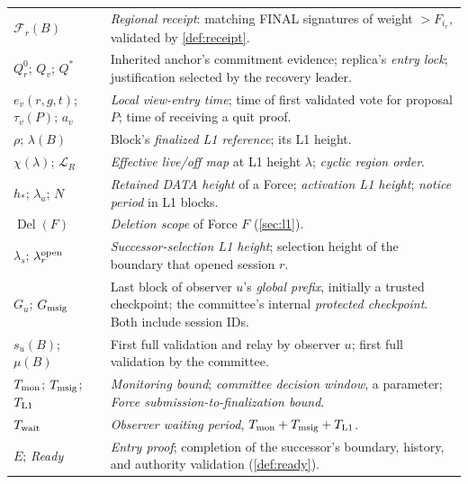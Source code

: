\documentclass[11pt,a4paper]{article}
\newcommand{\FC}{\mathcal F}
\newcommand{\Del}{\operatorname{Del}}
\newcommand{\Twait}{T_{\rm wait}}
\newcommand{\defterm}[1]{\textcolor{rrBlue}{\textit{#1}}}
\begin{document}
\begin{table}[htbp]
\begin{tabularx}{\linewidth}{@{}p{.29\linewidth}Y@{}}
$\FC_r(B)$ & \defterm{Regional receipt}: matching FINAL signatures of weight
$>F_{i_r}$, validated by \cref{def:receipt}.\\
$Q_r^0$; $Q_v$; $Q^*$ & Inherited anchor's commitment evidence; replica's \defterm{entry
lock}; justification selected by the recovery leader.\\
$e_v(r,g,t)$; $\tau_v(P)$; $a_v$ & \defterm{Local view-entry time}; time of first
validated vote for proposal $P$; time of receiving a quit proof.\\
$\rho$; $\lambda(B)$ & Block's \defterm{finalized L1 reference}; its L1 height.\\
$\chi(\lambda)$; $\mathcal L_R$ & \defterm{Effective live/off map} at L1 height
$\lambda$; \defterm{cyclic region order}.\\
$h_*$; $\lambda_a$; $N$ & \defterm{Retained DATA height} of a
Force; \defterm{activation L1 height}; \defterm{notice period} in L1 blocks.\\
$\Del(F)$ & \defterm{Deletion scope} of Force $F$ (\cref{sec:l1}).\\
$\lambda_s$; $\lambda_r^{\rm open}$ & \defterm{Successor-selection L1 height};
selection height of the boundary that opened session $r$.\\
$G_u$; $G_{\rm msig}$ & Last block of observer $u$'s
\defterm{global prefix}, initially a trusted checkpoint; the committee's internal
\defterm{protected checkpoint}. Both include session IDs.\\
$s_u(B)$; $\mu(B)$ & First full validation and relay by observer $u$;
first full validation by the committee.\\
$T_{\rm mon}$; $T_{\rm msig}$; $T_{\rm L1}$ & \defterm{Monitoring bound};
\defterm{committee decision window}, a parameter; \defterm{Force submission-to-finalization bound}.\\
$\Twait$ & \defterm{Observer waiting period},
$T_{\rm mon}+T_{\rm msig}+T_{\rm L1}$.\\
$E$; \defterm{Ready} & \defterm{Entry proof}; completion of the
successor's boundary, history, and authority validation (\cref{def:ready}).\\
\bottomrule
\end{tabularx}
\end{table}
\end{document}
